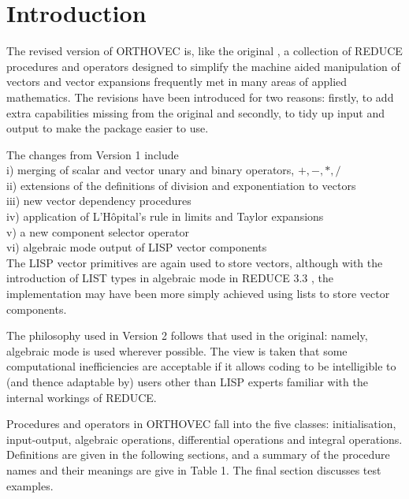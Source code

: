 \newpage
\section{Introduction}
The revised version of ORTHOVEC is, like the original \cite{r4}, a 
collection of REDUCE procedures and operators designed to simplify the
machine aided manipulation of vectors and vector expansions frequently
met in many areas of applied mathematics.  The revisions
have been introduced for two reasons: firstly, to add extra capabilities
missing from the original and secondly, to tidy up input and
output to make the package easier to use.

The changes from Version 1 include\\
i) merging of scalar and vector unary and binary operators, $+, - , *, /
$\\
ii) extensions of the definitions of division and exponentiation 
to vectors\\
iii) new vector dependency procedures\\
iv) application of L'H\^opital's rule in limits and Taylor expansions\\
v) a new component selector operator\\
vi) algebraic mode output of LISP vector components\\

The LISP vector primitives are again used to store vectors, although 
with the introduction of LIST types in algebraic mode in REDUCE
3.3 \cite{r1}, the implementation may have been more simply achieved 
using lists to store vector components.

The philosophy used in Version 2 follows that used in the original: 
namely, algebraic mode is used wherever possible.  The view 
is taken that some computational inefficiencies are 
acceptable if it allows coding to be 
intelligible to (and thence adaptable by)
users other than LISP experts familiar
with the internal workings of REDUCE.

Procedures and operators in ORTHOVEC fall into the five classes: 
initialisation, input-output, algebraic operations, differential
operations and integral operations.  Definitions are given in 
the following sections, and
a summary of the procedure names and their meanings are give in Table 1.
The final section discusses test examples.

